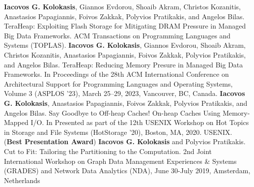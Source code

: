 



\begin{cventries}
  \cventry
    {}
    {}
    {}
    {}
    {\textbf{Iacovos G. Kolokasis}, Giannos Evdorou, Shoaib Akram,
      Christos Kozanitis, Anastasios Papagiannis, Foivos Zakkak, 
      Polyvios Pratikakis, and Angelos Bilas. TeraHeap: Exploiting Flash Storage for
      Mitigating DRAM Pressure in Managed Big Data Frameworks. ACM Transactions on
    Programming Languages and Systems (TOPLAS).}
  {}
  \cventry
    {}
    {}
    {}
    {}
	{\textbf{Iacovos G. Kolokasis}, Giannos Evdorou, Shoaib Akram,
	Christos Kozanitis, Anastasios Papagiannis, Foivos Zakkak, 
	Polyvios Pratikakis, and Angelos Bilas. TeraHeap: Reducing Memory
  Presure in Managed Big Data Frameworks. In Proceedings of the 28th
  ACM International Conference on Architectural Support for
  Programming Languages and Operating Systems, Volume 3 (ASPLOS ’23),
  March 25–29, 2023, Vancouver, BC, Canada.}
  {}
  \cventry
    {}
    {}
    {}
    {}
    {\textbf{Iacovos G. Kolokasis}, Anastasios Papagiannis, Foivos
    Zakkak, Polyvios Pratikakis, and Angelos Bilas.%
    Say Goodbye to Off-heap Caches! On-heap Caches Using Memory-Mapped
    I/O. In Presented as part of the 12th USENIX Workshop on Hot
    Topics in Storage and File Systems (HotStorage '20), Boston, MA,
    2020. USENIX. (\textbf{Best Presentation Award})}
  {}
  \cventry
    {}
    {}
    {}
    {}
    {\textbf{Iacovos G. Kolokasis} and Polyvios
  Pratikakis. Cut to Fit: Tailoring the Partitioning to the
  Computation. 2nd Joint International Workshop on Graph Data
  Management Experiences \& Systems (GRADES) and Network Data
  Analytics (NDA), June 30-July 2019, Amsterdam, Netherlands}
  {}

\end{cventries}

